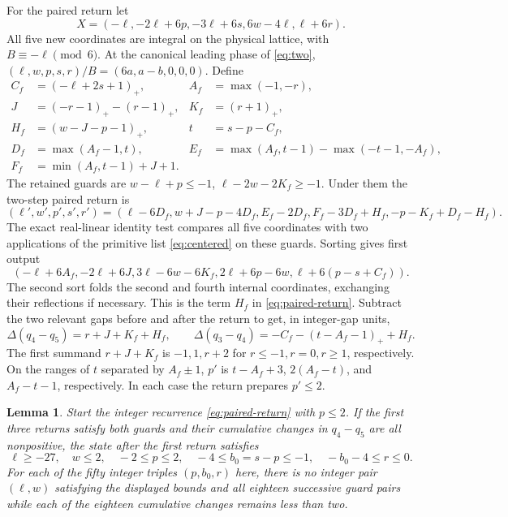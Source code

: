 \documentclass[11pt,reqno]{amsart}
\newtheorem{lemma}[theorem]{Lemma}
\theoremstyle{remark}
\begin{document}
For the paired return let
\[
 X=(-\ell,-2\ell+6p,-3\ell+6s,6w-4\ell,\ell+6r).
\]
All five new coordinates are integral on the physical lattice, with \(B\equiv-\ell\pmod6\). At the canonical leading phase of \eqref{eq:two}, \((\ell,w,p,s,r)/B=(6a,a-b,0,0,0)\). Define
\begin{align*}
 C_f&=(-\ell+2s+1)_+,& A_f&=\max(-1,-r),\\
 J&=(-r-1)_+-(r-1)_+,& K_f&=(r+1)_+,\\
 H_f&=(w-J-p-1)_+,& t&=s-p-C_f,\\
 D_f&=\max(A_f-1,t),&
 E_f&=\max(A_f,t-1)-\max(-t-1,-A_f),\\
 F_f&=\min(A_f,t-1)+J+1.
\end{align*}
The retained guards are \(w-\ell+p\le-1\), \(\ell-2w-2K_f\ge-1\). Under them the two-step paired return is
\begin{equation}\label{eq:paired-return}
 (\ell',w',p',s',r')
 =(\ell-6D_f,w+J-p-4D_f,E_f-2D_f,F_f-3D_f+H_f,-p-K_f+D_f-H_f).
\end{equation}
The exact real-linear identity test compares all five coordinates with two applications of the primitive list \eqref{eq:centered} on these guards. Sorting gives first output
\[
 (-\ell+6A_f,-2\ell+6J,3\ell-6w-6K_f,
 2\ell+6p-6w,\ell+6(p-s+C_f)).
\]
The second sort folds the second and fourth internal coordinates, exchanging their reflections if necessary. This is the term \(H_f\) in \eqref{eq:paired-return}. Subtract the two relevant gaps before and after the return to get, in integer-gap units,
\[
 \Delta(q_4-q_5)=r+J+K_f+H_f,\qquad
 \Delta(q_3-q_4)=-C_f-(t-A_f-1)_++H_f .
\]
The first summand \(r+J+K_f\) is \(-1,1,r+2\) for \(r\le-1,r=0,r\ge1\), respectively. On the ranges of \(t\) separated by \(A_f\pm1\), \(p'\) is \(t-A_f+3\), \(2(A_f-t)\), and \(A_f-t-1\), respectively. In each case the return prepares \(p'\le2\).

\begin{lemma}\label{lem:quadrant}
Start the integer recurrence \eqref{eq:paired-return} with \(p\le2\). If the first three returns satisfy both guards and their cumulative changes in \(q_4-q_5\) are all nonpositive, the state after the first return satisfies
\[
 \ell\ge-27,\quad w\le2,\quad
 -2\le p\le2,\quad -4\le b_0=s-p\le-1,\quad -b_0-4\le r\le0.
\]
For each of the fifty integer triples \((p,b_0,r)\) here, there is no integer pair \((\ell,w)\) satisfying the displayed bounds and all eighteen successive guard pairs while each of the eighteen cumulative changes remains less than two.
\end{lemma}
\end{document}
